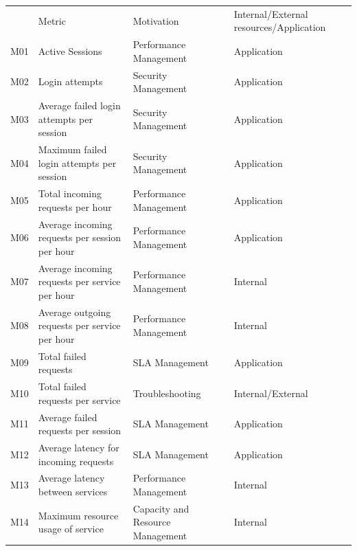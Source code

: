 \begin{table}[]
\begin{tabular}{llll}
    & Metric                                             & Motivation                       & Internal/External resources/Application \\
M01 & Active Sessions                                    & Performance Management           & Application                             \\
M02 & Login attempts                                     & Security Management              & Application                             \\
M03 & Average failed login attempts per session          & Security Management              & Application                             \\
M04 & Maximum failed login attempts per session          & Security Management              & Application                             \\
M05 & Total incoming requests per hour                   & Performance Management           & Application                             \\
M06 & Average incoming requests per session per hour     & Performance Management           & Application                             \\
M07 & Average incoming requests per service per hour     & Performance Management           & Internal                                \\
M08 & Average outgoing requests per service per hour     & Performance Management           & Internal                                \\
M09 & Total failed requests                              & SLA Management                   & Application                             \\
M10 & Total failed requests per service                  & Troubleshooting                  & Internal/External                       \\
M11 & Average failed requests per session                & SLA Management                   & Application                             \\
M12 & Average latency for incoming requests              & SLA Management                   & Application                             \\
M13 & Average latency between services                   & Performance Management           & Internal                                \\
M14 & Maximum resource usage of service                  & Capacity and Resource Management & Internal                                \\

\end{tabular}
\end{table}
